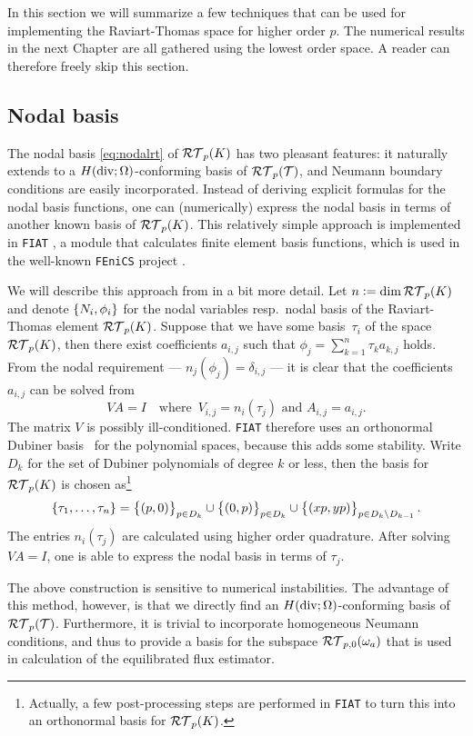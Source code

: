 \documentclass[thesis.tex]{subfiles}
\begin{document}
  In this section we will summarize a few techniques that can be used for implementing the Raviart-Thomas space for higher order $p$.
  The numerical results in the next Chapter are all gathered using the lowest order space. A reader can therefore freely skip this section.

  \subsection{Nodal basis}
  The nodal basis \eqref{eq:nodalrt} of $\mathcal{RT}_p(K)$ has two pleasant features: it
  naturally extends to a $H(\operatorname{div}; \Omega)$-conforming basis of $\mathcal{RT}_p(\mathcal{T})$, and Neumann boundary conditions are easily incorporated.
  Instead of deriving explicit formulas for the nodal basis functions, one can (numerically) express the nodal basis in terms
  of another known basis of $\mathcal{RT}_p(K)$. This relatively simple approach is implemented in \texttt{FIAT} \cite{kirby}, a module that 
  calculates finite element basis functions,  
  which is used in the well-known \texttt{FEniCS} project \cite{fenics}. 

  We will describe this approach from \cite{kirby} in a bit more detail. Let $n := \dim \mathcal{RT}_p(K)$ and denote $\set{N_i, \phi_i}$ for the nodal variables 
  resp.~nodal basis of the Raviart-Thomas element $\mathcal{RT}_p(K)$.
  Suppose that we have some basis~$\tau_i$ of the space~$\mathcal{RT}_p(K)$, then there exist coefficients $a_{i,j}$ such that
  $\phi_j = \sum_{k = 1}^n \tau_k a_{k,j}$ holds.
  From the nodal requirement --- $n_j(\phi_j) = \delta_{i,j}$ --- it is clear that the coefficients $a_{i,j}$ can be solved from
  \[
    VA = I \quad \text{where }\, V_{i,j} = n_i(\tau_j) \text{ and } A_{i,j} = a_{i,j}.
  \]
  The matrix $V$ is possibly ill-conditioned. \texttt{FIAT} therefore uses an orthonormal Dubiner basis~\cite{dubiner1991spectral} for the polynomial spaces,
  because this adds some stability. Write $D_k$ for the set of Dubiner polynomials of degree $k$ or less,
  then the basis for $\mathcal{RT}_p(K)$ is chosen as\footnote{Actually, a few post-processing steps are performed in \texttt{FIAT} to turn this into an orthonormal basis for $\mathcal{RT}_p(K)$.}
  \[
    \set{\tau_1,\dots, \tau_n} = \set{(p,0)}_{p \in D_k} \cup \set{(0,p)}_{p \in D_k} \cup \set{(xp, yp)}_{p \in D_k \setminus D_{k-1}}.
  \]
  The entries $n_i(\tau_j)$ are calculated using higher order quadrature. After solving $VA = I$, one is 
  able to express the nodal basis in terms of $\tau_j$.

  The above construction is sensitive to numerical instabilities. The advantage of this method, however, is that
  we directly find an $H(\operatorname{div}; \Omega)$-conforming basis of $\mathcal{RT}_p(\mathcal{T})$. Furthermore, it is trivial to incorporate homogeneous Neumann conditions,
  and thus to provide a basis for the subspace $\mathcal{RT}_{p,0}(\omega_a)$ that
  is used in calculation of the equilibrated flux estimator.
\end{document}
